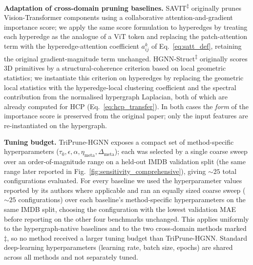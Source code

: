 \documentclass[10pt]{article}
\theoremstyle{plain}
\theoremstyle{definition}
\begin{document}
\textbf{Adaptation of cross-domain pruning baselines.} SAVIT\textsuperscript{$\ddagger$} originally prunes Vision-Transformer components using a collaborative attention-and-gradient importance score; we apply the same score formulation to hyperedges by treating each hyperedge as the analogue of a ViT token and replacing the patch-attention term with the hyperedge-attention coefficient $a^{k}_{ij}$ of Eq.~\eqref{eq:satt_def}, retaining the original gradient-magnitude term unchanged. HGNN-Struct\textsuperscript{$\ddagger$} originally scores 3D primitives by a structural-coherence criterion based on local geometric statistics; we instantiate this criterion on hyperedges by replacing the geometric local statistics with the hyperedge-local clustering coefficient and the spectral contribution from the normalised hypergraph Laplacian, both of which are already computed for HCP (Eq.~\eqref{eq:hcp_transfer}). In both cases the \emph{form} of the importance score is preserved from the original paper; only the input features are re-instantiated on the hypergraph.

\textbf{Tuning budget.} TriPrune-HGNN exposes a compact set of method-specific hyperparameters ($\tau_0,\epsilon,\alpha,\eta_{\mathrm{meta}}, \Delta_{\mathrm{meta}}$); each was selected by a single coarse sweep over an order-of-magnitude range on a held-out IMDB validation split (the same range later reported in Fig.~\ref{fig:sensitivity_comprehensive}), giving $\sim\!25$ total configurations evaluated. For every baseline we used the hyperparameter values reported by its authors where applicable and ran an equally sized coarse sweep ($\sim\!25$ configurations) over each baseline's method-specific hyperparameters on the same IMDB split, choosing the configuration with the lowest validation MAE before reporting on the other four benchmarks unchanged. This applies uniformly to the hypergraph-native baselines and to the two cross-domain methods marked $\ddagger$, so no method received a larger tuning budget than TriPrune-HGNN. Standard deep-learning hyperparameters (learning rate, batch size, epochs) are shared across all methods and not separately tuned.
\end{document}
